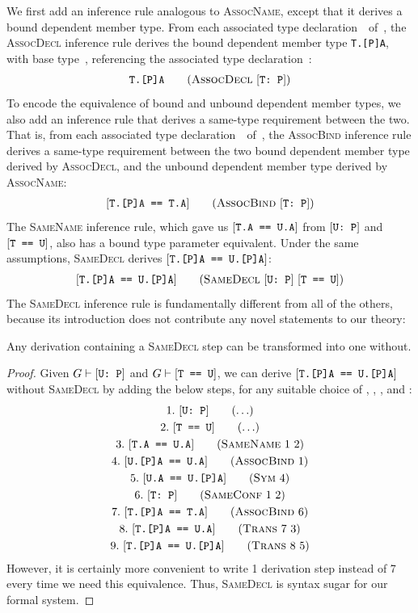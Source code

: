 \documentclass[../generics]{subfiles}
\begin{document}
We first add an inference rule analogous to \textsc{AssocName}, except that it derives a bound dependent member type. From each associated type declaration~\nA\ of~\tP, the \textsc{AssocDecl} inference rule derives the bound dependent member type \texttt{T.[P]A}, with base type~\tT, referencing the associated type declaration~\nA:
\begin{gather*}
\AssocDeclStepDef
\end{gather*}
To encode the equivalence of bound and unbound dependent member types, we also add an inference rule that derives a same-type requirement between the two. That is, from each associated type declaration~\nA\ of~\tP, the \textsc{AssocBind} inference rule derives a same-type requirement between the two bound dependent member type derived by \textsc{AssocDecl}, and the unbound dependent member type derived by \textsc{AssocName}:
\begin{gather*}
\AssocBindStepDef
\end{gather*}
The \textsc{SameName} inference rule, which gave us $[\texttt{T.A == U.A}]$ from $[\texttt{U:~P}]$ and $[\texttt{T == U}]$, also has a bound type parameter equivalent. Under the same assumptions, \textsc{SameDecl} derives $[\texttt{T.[P]A == U.[P]A}]$:
\begin{gather*}
\SameDeclStepDef
\end{gather*}
The \textsc{SameDecl} inference rule is fundamentally different from all of the others, because its introduction does not contribute any novel statements to our theory:
\begin{proposition}
Any derivation containing a \textsc{SameDecl} step can be transformed into one without.
\end{proposition}
\begin{proof}
Given $G\vdash[\texttt{U:~P}]$ and $G\vdash[\texttt{T == U}]$, we can derive $[\texttt{T.[P]A == U.[P]A}]$ without \textsc{SameDecl} by adding the below steps, for any suitable choice of \tT, \tU, \tP, and \nA:
\begin{gather*}
\AnyStep{\ConfReq{U}{P}}{1}\\
\AnyStep{\TU}{2}\\
\SameNameStep{1}{2}{T.A}{U.A}{3}\\
\AssocBindStep{1}{U.[P]A}{U.A}{4}\\
\SymStep{4}{U.A}{U.[P]A}{5}\\
\SameConfStep{1}{2}{T}{P}{6}\\
\AssocBindStep{6}{T.[P]A}{T.A}{7}\\
\TransStep{7}{3}{T.[P]A}{U.A}{8}\\
\TransStep{8}{5}{T.[P]A}{U.[P]A}{9}
\end{gather*}
However, it is certainly more convenient to write 1 derivation step instead of 7 every time we need this equivalence. Thus, \textsc{SameDecl} is syntax sugar for our formal system.
\end{proof}
\end{document}
